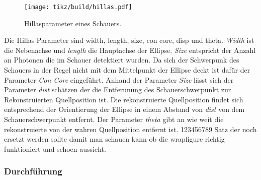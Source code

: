 \begin{wrapfigure}[15]{o}{0.4\textwidth}
	\centering
	\texttt{[image: tikz/build/hillas.pdf]}
	\caption{Hillasparameter eines Schauers.}
	\label{fig:hillas}
\end{wrapfigure}
Die Hillas Parameter sind width, length, size, con core, disp und theta.
\textit{Width} ist die Nebenachse und \textit{length} die Hauptachse der Ellipse. 
\textit{Size} entspricht der Anzahl an Photonen die im Schauer detektiert wurden.
Da sich der Schwerpunk des Schauers in der Regel nicht mit dem Mittelpunkt der
Ellipse deckt ist dafür der Parameter \textit{Con Core} eingeführt.
Anhand der Parameter \textit{Size} lässt sich der Parameter \textit{dist}
schätzen der die Entferunung des Schauerschwerpunkt zur Rekonstruierten
Quellposition ist.
Die rekonstruierte Quellposition findet sich entsprechend der Orientierung der
Ellipse in einem Abstand von \textit{dist} von dem Schauerschwerpunkt entfernt.
Der Parameter \textit{theta} gibt an wie weit die rekonstruierte von der wahren
Quellposition entfernt ist.
123456789 Satz der noch ersetzt werden sollte damit man schauen kann ob die wrapfigure
richtig funktioniert und schoen aussieht.

\subsubsection*{Durchführung}
